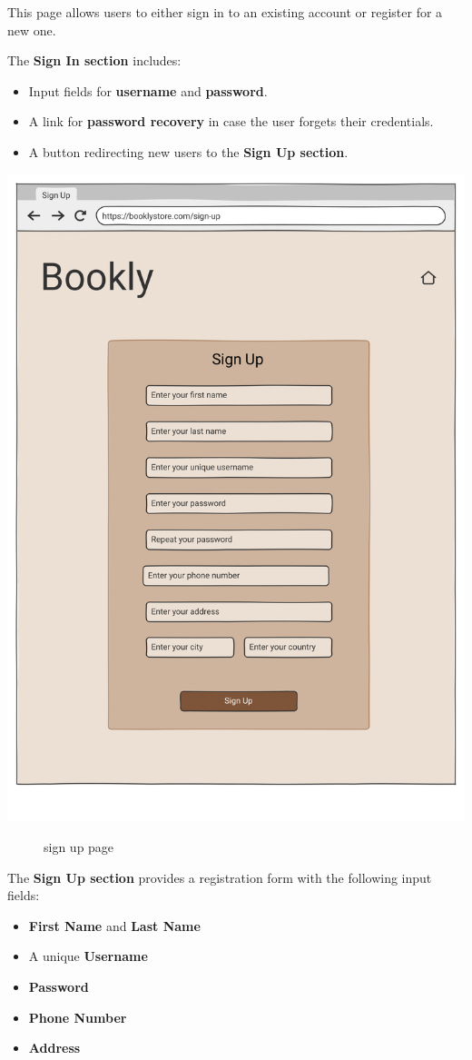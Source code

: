 \label{sec:signin}
This page allows users to either sign in to an existing account or register for a new one.

The \textbf{Sign In section} includes:
\begin{itemize}
    \item Input fields for \textbf{username} and \textbf{password}.
    \item A link for \textbf{password recovery} in case the user forgets their credentials.
    \item A button redirecting new users to the \textbf{Sign Up section}.
\end{itemize}

\includegraphics[width=0.6\linewidth]{HW1Report/photos/signup.png}

\begin{figure}[h!]
    \centering
    \caption{sign up page}
    \label{fig:enter-label}
\end{figure}
The \textbf{Sign Up section} provides a registration form with the following input fields:
\begin{itemize}
    \item \textbf{First Name} and \textbf{Last Name}
    \item A unique \textbf{Username}
    \item \textbf{Password}
    \item \textbf{Phone Number}
    \item \textbf{Address}
\end{itemize}


